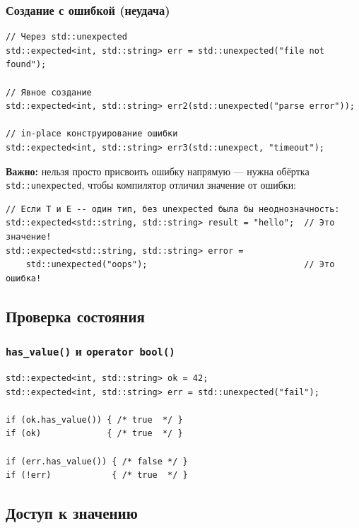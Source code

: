 \documentclass[a4paper,12pt]{article}
\begin{document}
\subsubsection{Создание с ошибкой (неудача)}

\begin{lstlisting}
// Через std::unexpected
std::expected<int, std::string> err = std::unexpected("file not found");

// Явное создание
std::expected<int, std::string> err2(std::unexpected("parse error"));

// in-place конструирование ошибки
std::expected<int, std::string> err3(std::unexpect, "timeout");
\end{lstlisting}

\textbf{Важно:} нельзя просто присвоить ошибку напрямую --- нужна обёртка
\texttt{std::unexpected}, чтобы компилятор отличил значение от ошибки:

\begin{lstlisting}
// Если T и E -- один тип, без unexpected была бы неоднозначность:
std::expected<std::string, std::string> result = "hello";  // Это значение!
std::expected<std::string, std::string> error =
    std::unexpected("oops");                               // Это ошибка!
\end{lstlisting}

\subsection{Проверка состояния}

\subsubsection{\texttt{has\_value()} и \texttt{operator bool()}}

\begin{lstlisting}
std::expected<int, std::string> ok = 42;
std::expected<int, std::string> err = std::unexpected("fail");

if (ok.has_value()) { /* true  */ }
if (ok)             { /* true  */ }

if (err.has_value()) { /* false */ }
if (!err)            { /* true  */ }
\end{lstlisting}

\subsection{Доступ к значению}
\end{document}
